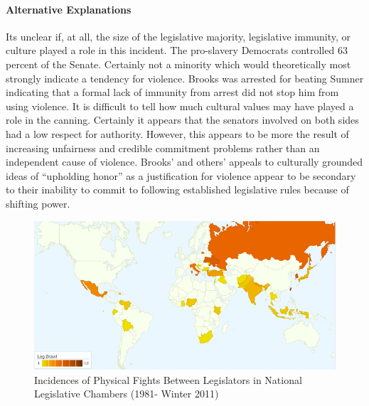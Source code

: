 \documentclass[a4paper]{article}\usepackage[]{graphicx}\usepackage[]{color}
\begin{document}
\paragraph{Alternative Explanations}

Its unclear if, at all, the size of the legislative majority, legislative immunity, or culture played a role in this incident. The pro-slavery Democrats controlled 63 percent of the Senate. Certainly not a minority which would theoretically most strongly indicate a tendency for violence. Brooks was arrested for beating Sumner indicating that a formal lack of immunity from arrest did not stop him from using violence. It is difficult to tell how much cultural values may have played a role in the canning. Certainly it appears that the senators involved on both sides had a low respect for authority. However, this appears to be more the result of increasing unfairness and credible commitment problems rather than an independent cause of violence. Brooks' and others' appeals to culturally grounded ideas of ``upholding honor'' \cite[555]{Pierson1995} as a justification for violence appear to be secondary to their inability to commit to following established legislative rules because of shifting power.

\begin{figure}[h!]
    \centering
    \caption{Incidences of Physical Fights Between Legislators in National Legislative Chambers (1981- Winter 2011)}
    \label{leg_map}
        \includegraphics[width = 13cm]{incidence_map.png}
\end{figure}
\end{document}
